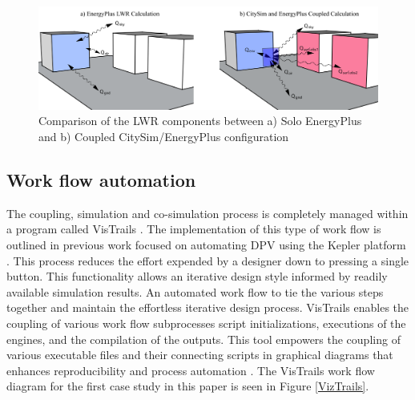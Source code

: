 \documentclass{tBPS2e}
\theoremstyle{plain}
\theoremstyle{definition}
\theoremstyle{remark}
\newcommand{\noteCM}[1]{\footnote{\textcolor{red}{#1}}}
\newcommand{\noteDT}[1]{\footnote{\textcolor{green}{#1}}}
\begin{document}
\begin{figure}[H]
  \centering
  \includegraphics[width=1.0\textwidth]{figures/LWRCalc_Combined_V3}
  \caption{Comparison of the LWR components between a) Solo EnergyPlus and b) Coupled CitySim/EnergyPlus configuration \citep{Miller:2015vk}
  \label{combinedLWR}}
\end{figure}

\subsection{Work flow automation}
The coupling, simulation and co-simulation process is completely managed
within a program called VisTrails \citep{Anonymous:Cayf2tu7}. The
implementation of this type of work flow is outlined in previous work focused
on automating DPV using the Kepler platform \citep{Thomas:2012wj}. This
process reduces the effort expended by a designer down to pressing a single
button. This functionality allows an iterative design style informed by
readily available simulation results. An automated work flow to tie the
various steps together and maintain the effortless iterative design process.
VisTrails enables the coupling of various work flow subprocesses script
initializations, executions of the engines, and the compilation of the
outputs. This tool empowers the coupling of various executable files and their
connecting scripts in graphical diagrams that enhances reproducibility and
process automation \citep{Freire:2014tt}. The VisTrails work flow diagram for
the first case study in this paper is seen in Figure \ref{VizTrails}.

\end{document}
